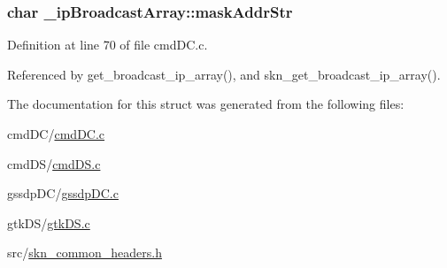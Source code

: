 \hypertarget{struct__ip_broadcast_array_a9241c1fbfb22a3ecfe4777863a063eb3}{}
\subsubsection[{mask\+Addr\+Str}]{\setlength{\rightskip}{0pt plus 5cm}char \+\_\+ip\+Broadcast\+Array\+::mask\+Addr\+Str}\label{struct__ip_broadcast_array_a9241c1fbfb22a3ecfe4777863a063eb3}


Definition at line 70 of file cmd\+D\+C.\+c.



Referenced by get\+\_\+broadcast\+\_\+ip\+\_\+array(), and skn\+\_\+get\+\_\+broadcast\+\_\+ip\+\_\+array().



The documentation for this struct was generated from the following files\+:\begin{DoxyCompactItemize}
\item 
cmd\+D\+C/\hyperlink{cmd_d_c_8c}{cmd\+D\+C.\+c}\item 
cmd\+D\+S/\hyperlink{cmd_d_s_8c}{cmd\+D\+S.\+c}\item 
gssdp\+D\+C/\hyperlink{gssdp_d_c_8c}{gssdp\+D\+C.\+c}\item 
gtk\+D\+S/\hyperlink{gtk_d_s_8c}{gtk\+D\+S.\+c}\item 
src/\hyperlink{skn__common__headers_8h}{skn\+\_\+common\+\_\+headers.\+h}\end{DoxyCompactItemize}
